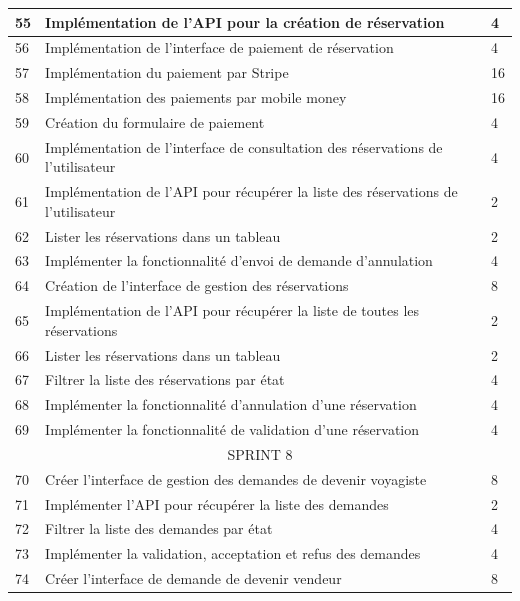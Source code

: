 \documentclass[12pt]{report}
\begin{document}
\begin{longtable}{|p{1cm}|p{7cm}|p{6cm}|}
						\hline
						55 & Implémentation de l'API pour la création de réservation & 4\\
						\hline
						56 & Implémentation de l'interface de paiement de réservation & 4\\
						\hline
						57 & Implémentation du paiement par Stripe & 16\\
						\hline
						58 & Implémentation des paiements par mobile money & 16\\
						\hline
						59 & Création du formulaire de paiement & 4\\
						\hline
						60 & Implémentation de l'interface de consultation des réservations de l'utilisateur & 4\\
						\hline
						61 & Implémentation de l'API pour récupérer la liste des réservations de l'utilisateur & 2\\
						\hline
						62 & Lister les réservations dans un tableau & 2\\
						\hline
						63 & Implémenter la fonctionnalité d'envoi de demande d'annulation & 4\\
						\hline
						64 & Création de l'interface de gestion des réservations & 8\\
						\hline
						65 & Implémentation de l'API pour récupérer la liste de toutes les réservations & 2\\
						\hline
						66 & Lister les réservations dans un tableau & 2\\
						\hline
						67 & Filtrer la liste des réservations par état & 4\\
						\hline
						68 & Implémenter la fonctionnalité d'annulation d'une réservation & 4\\
						\hline
						69 & Implémenter la fonctionnalité de validation d'une réservation & 4\\
						\hline
						\multicolumn{3}{|c|}{SPRINT 8}\\
						\hline
						70 & Créer l'interface de gestion des demandes de devenir voyagiste & 8\\
						\hline
						71 & Implémenter l'API pour récupérer la liste des demandes & 2\\
						\hline
						72 & Filtrer la liste des demandes par état & 4\\
						\hline
						73 & Implémenter la validation, acceptation et refus des demandes & 4\\
						\hline
						74 & Créer l'interface de demande de devenir vendeur & 8\\
						\hline

\end{longtable}
\end{document}
